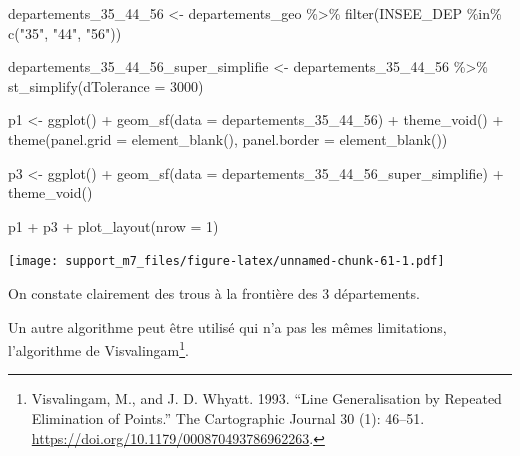 \documentclass[
]{book}
\newenvironment{Shaded}{\begin{snugshade}}{\end{snugshade}}
\newcommand{\AttributeTok}[1]{\textcolor[rgb]{0.77,0.63,0.00}{#1}}
\newcommand{\DecValTok}[1]{\textcolor[rgb]{0.00,0.00,0.81}{#1}}
\newcommand{\FunctionTok}[1]{\textcolor[rgb]{0.00,0.00,0.00}{#1}}
\newcommand{\NormalTok}[1]{#1}
\newcommand{\OtherTok}[1]{\textcolor[rgb]{0.56,0.35,0.01}{#1}}
\newcommand{\SpecialCharTok}[1]{\textcolor[rgb]{0.00,0.00,0.00}{#1}}
\newcommand{\StringTok}[1]{\textcolor[rgb]{0.31,0.60,0.02}{#1}}
\begin{document}
\begin{Shaded}
\begin{Highlighting}[]
\NormalTok{departements\_35\_44\_56 }\OtherTok{\textless{}{-}}\NormalTok{ departements\_geo }\SpecialCharTok{\%\textgreater{}\%}
  \FunctionTok{filter}\NormalTok{(INSEE\_DEP }\SpecialCharTok{\%in\%} \FunctionTok{c}\NormalTok{(}\StringTok{"35"}\NormalTok{, }\StringTok{"44"}\NormalTok{, }\StringTok{"56"}\NormalTok{))}

\NormalTok{departements\_35\_44\_56\_super\_simplifie }\OtherTok{\textless{}{-}}\NormalTok{ departements\_35\_44\_56 }\SpecialCharTok{\%\textgreater{}\%}
  \FunctionTok{st\_simplify}\NormalTok{(}\AttributeTok{dTolerance =} \DecValTok{3000}\NormalTok{)}
\end{Highlighting}
\end{Shaded}

\begin{Shaded}
\begin{Highlighting}[]
\NormalTok{p1 }\OtherTok{\textless{}{-}} \FunctionTok{ggplot}\NormalTok{() }\SpecialCharTok{+} 
  \FunctionTok{geom\_sf}\NormalTok{(}\AttributeTok{data =}\NormalTok{ departements\_35\_44\_56) }\SpecialCharTok{+} 
  \FunctionTok{theme\_void}\NormalTok{() }\SpecialCharTok{+} 
  \FunctionTok{theme}\NormalTok{(}\AttributeTok{panel.grid =} \FunctionTok{element\_blank}\NormalTok{(), }\AttributeTok{panel.border =} \FunctionTok{element\_blank}\NormalTok{())}

\NormalTok{p3 }\OtherTok{\textless{}{-}} \FunctionTok{ggplot}\NormalTok{() }\SpecialCharTok{+} 
  \FunctionTok{geom\_sf}\NormalTok{(}\AttributeTok{data =}\NormalTok{ departements\_35\_44\_56\_super\_simplifie) }\SpecialCharTok{+} 
  \FunctionTok{theme\_void}\NormalTok{()}

\NormalTok{p1 }\SpecialCharTok{+}\NormalTok{ p3 }\SpecialCharTok{+} \FunctionTok{plot\_layout}\NormalTok{(}\AttributeTok{nrow =} \DecValTok{1}\NormalTok{)}
\end{Highlighting}
\end{Shaded}

\texttt{[image: support\_m7\_files/figure-latex/unnamed-chunk-61-1.pdf]}

On constate clairement des trous à la frontière des 3 départements.

Un autre algorithme peut être utilisé qui n'a pas les mêmes limitations, l'algorithme de Visvalingam\footnote{Visvalingam, M., and J. D. Whyatt. 1993. ``Line Generalisation by Repeated Elimination of Points.'' The Cartographic Journal 30 (1): 46--51. \url{https://doi.org/10.1179/000870493786962263}.}.
\end{document}
